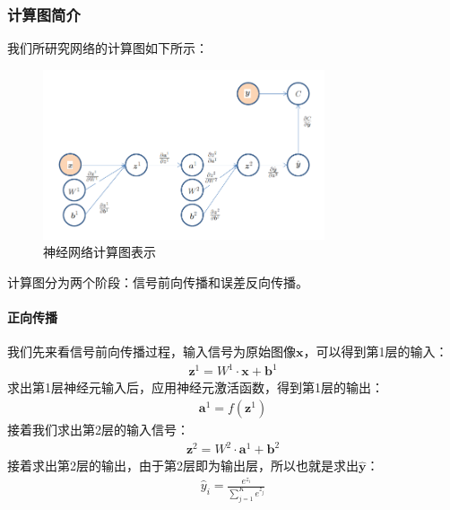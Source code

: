\documentclass[UTF8]{article}
\begin{document}
\subsubsection{计算图简介}
我们所研究网络的计算图如下所示：
\begin{figure}[H]
	\caption{神经网络计算图表示}
	\label{f000061}
	\centering
	\includegraphics[height=5cm]{images/f000061}
\end{figure}
计算图分为两个阶段：信号前向传播和误差反向传播。\newline
\paragraph{正向传播}
我们先来看信号前向传播过程，输入信号为原始图像$\boldsymbol{x}$，可以得到第1层的输入：
\begin{equation}
\begin{aligned}
\boldsymbol{z}^1=W^1 \cdot \boldsymbol{x} + \boldsymbol{b}^1
\end{aligned}
\label{mlp-cg-forward-1}
\end{equation}
求出第1层神经元输入后，应用神经元激活函数，得到第1层的输出：
\begin{equation}
\begin{aligned}
\boldsymbol{a}^1=f(\boldsymbol{z}^1)
\end{aligned}
\label{mlp-cg-forward-2}
\end{equation}
接着我们求出第2层的输入信号：
\begin{equation}
\begin{aligned}
\boldsymbol{z}^2=W^2 \cdot \boldsymbol{a}^1 + \boldsymbol{b}^2
\end{aligned}
\label{mlp-cg-forward-3}
\end{equation}
接着求出第2层的输出，由于第2层即为输出层，所以也就是求出$\hat{\boldsymbol{y}}$：
\begin{equation}
\begin{aligned}
\hat{y}_i=\frac{e^{z_i}}{\sum_{j=1}^{K}e^{z_j}}
\end{aligned}
\label{mlp-cg-forward-4}
\end{equation}
\end{document}
